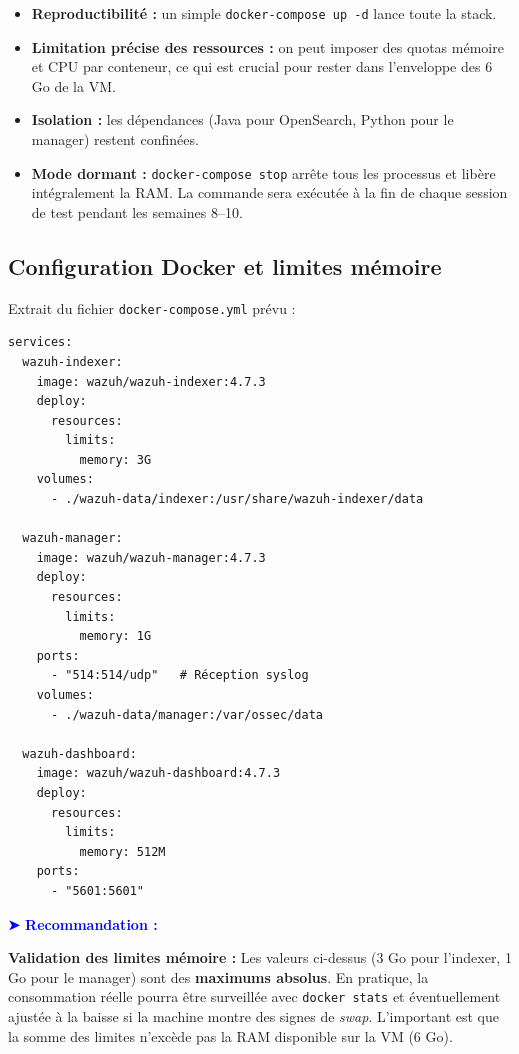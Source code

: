 \documentclass[12pt,a4paper]{article}
\newenvironment{recommandation}{
    \vspace{0.5em}
    \noindent\textbf{\textcolor{blue}{➤ Recommandation :}}\hspace{0.5em}
}{
    \vspace{0.5em}
}
\begin{document}
\begin{itemize}
    \item \textbf{Reproductibilité :} un simple \texttt{docker-compose up -d} lance toute la stack.
    \item \textbf{Limitation précise des ressources :} on peut imposer des quotas mémoire et CPU par conteneur, ce qui est crucial pour rester dans l'enveloppe des 6 Go de la VM.
    \item \textbf{Isolation :} les dépendances (Java pour OpenSearch, Python pour le manager) restent confinées.
    \item \textbf{Mode dormant :} \texttt{docker-compose stop} arrête tous les processus et libère intégralement la RAM. La commande sera exécutée à la fin de chaque session de test pendant les semaines 8–10.
\end{itemize}

\subsection{Configuration Docker et limites mémoire}

Extrait du fichier \texttt{docker-compose.yml} prévu :

\begin{Verbatim}[frame=single,fontsize=\small]
services:
  wazuh-indexer:
    image: wazuh/wazuh-indexer:4.7.3
    deploy:
      resources:
        limits:
          memory: 3G
    volumes:
      - ./wazuh-data/indexer:/usr/share/wazuh-indexer/data

  wazuh-manager:
    image: wazuh/wazuh-manager:4.7.3
    deploy:
      resources:
        limits:
          memory: 1G
    ports:
      - "514:514/udp"   # Réception syslog
    volumes:
      - ./wazuh-data/manager:/var/ossec/data

  wazuh-dashboard:
    image: wazuh/wazuh-dashboard:4.7.3
    deploy:
      resources:
        limits:
          memory: 512M
    ports:
      - "5601:5601"
\end{Verbatim}

\begin{recommandation}
\textbf{Validation des limites mémoire :} Les valeurs ci-dessus (3 Go pour l'indexer, 1 Go pour le manager) sont des \textbf{maximums absolus}. En pratique, la consommation réelle pourra être surveillée avec \texttt{docker stats} et éventuellement ajustée à la baisse si la machine montre des signes de \textit{swap}. L'important est que la somme des limites n'excède pas la RAM disponible sur la VM (6 Go).
\end{recommandation}
\end{document}
